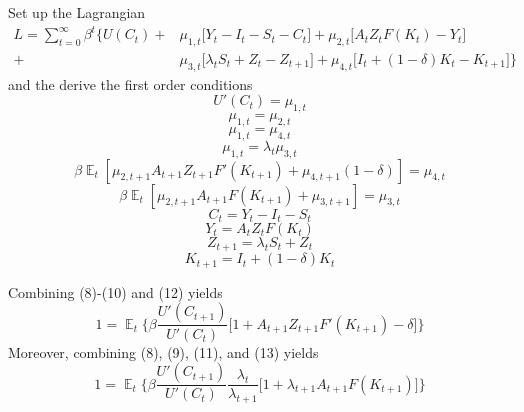\documentclass{article}
\DeclareMathOperator{\E}{\mathbb{E}}
\begin{document}
	Set up the Lagrangian
	\begin{equation}
	\begin{split}
	L = \sum_{t=0}^{\infty} \beta^t \Big\{ U(C_t)  + &\mu_{1,t}\big[ Y_t - I_t - S_t - C_t   \big]  + \mu_{2,t}\big[  A_t Z_t F(K_t) - Y_t  \big]  \\
	+ &\mu_{3,t}\big[ \lambda_t S_t + Z_t -  Z_{t+1}  \big]   + \mu_{4,t}\big[ I_t + (1 - \delta)K_t -  K_{t+1}  \big]  \Big\}
	\end{split}
	\end{equation}
	and the derive the first order conditions
	\begin{equation}
	U'(C_t) = \mu_{1,t}
	\end{equation}
	\begin{equation}
	\mu_{1,t} = \mu_{2,t}
	\end{equation}
	\begin{equation}
	\mu_{1,t} = \mu_{4,t}
	\end{equation}
	\begin{equation}
	\mu_{1,t} = \lambda_t \mu_{3,t}
	\end{equation}
	\begin{equation}
	\beta \E_t [ \mu_{2,t+1} A_{t+1} Z_{t+1} F'(K_{t+1}) + \mu_{4,t+1}(1-\delta) ] = \mu_{4,t}
	\end{equation}
	\begin{equation}
	\beta \E_t [ \mu_{2,t+1} A_{t+1} F(K_{t+1}) + \mu_{3,t+1} ] = \mu_{3,t}
	\end{equation}
	\begin{equation}
	C_t = Y_t - I_t - S_t
	\end{equation}
	\begin{equation}
	Y_t = A_t Z_t F(K_t)
	\end{equation}
	\begin{equation}
	Z_{t+1} = \lambda_t S_t + Z_t
	\end{equation}
	\begin{equation}
	K_{t+1} = I_t + (1 - \delta)K_t
	\end{equation}
	
	
	Combining (8)-(10) and (12) yields
	\begin{equation}
	1 = \E_t \Bigg\{ \beta \frac{U'(C_{t+1})}{U'(C_t)} \big[   1  + A_{t+1} Z_{t+1} F'(K_{t+1}) - \delta \big]   \Bigg\}
	\end{equation}
	Moreover, combining (8), (9), (11), and (13) yields
	\begin{equation}
	1 = \E_t \Bigg\{ \beta \frac{U'(C_{t+1})}{U'(C_t)} \frac{\lambda_t}{\lambda_{t+1}} \Bigg[ 1 + \lambda_{t+1}  A_{t+1}F(K_{t+1}) \Bigg]   \Bigg\}
	\end{equation}
	
\end{document}
